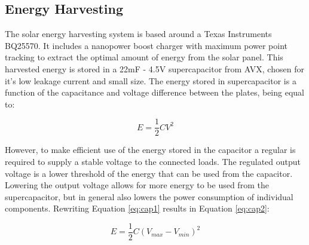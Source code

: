 \subsection{Energy Harvesting}
\label{subsec:energy_harvesting}




The solar energy harvesting system is based around a Texas Instruments BQ25570. 
It includes a nanopower boost charger with maximum power point tracking to extract the optimal amount of energy from the solar panel. 
This harvested energy is stored in a 22mF - 4.5V supercapacitor from AVX, chosen for it's low leakage current and small size.
The energy stored in supercapacitor is a function of the capacitance and voltage difference between the plates, being equal to:

\begin{equation}
\label{eq:cap1}
E = \frac{1}{2}CV^{2}
\end{equation}

However, to make efficient use of the energy stored in the capacitor a regular is required to supply a stable voltage to the connected loads.
The regulated output voltage is a lower threshold of the energy that can be used from the capacitor.
Lowering the output voltage allows for more energy to be used from the supercapacitor, but in general also lowers the power consumption of individual components. Rewriting Equation \ref{eq:cap1} results in Equation \ref{eq:cap2}:

\begin{equation}
\label{eq:cap2}
E = \frac{1}{2}C(V_{max} - V_{min})^{2}
\end{equation}

